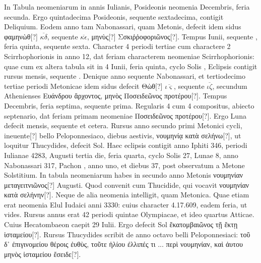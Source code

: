 
In Tabula neomeniarum in annis Iulianis, Posideonis neomenia 
Decembris, feria secunda.
Ergo quintadecima Posideonis, sequente
sextadecima, contigit Deliquium.
Eodem anno tam Nabonassari,
quam Metonis, defecit idem
 sidus \textgreek{φαμηνὼθ[?]} $\overline{\kappa\delta}$,
 sequente $\overline{\kappa\epsilon}$, \textgreek{μηνὺς[?]}
\textgreek{Σσκιῤῥοφοριῶνος[?]}.
Tempus  Iunii, sequente , feria quinta,
sequente sexta.
Character 4 periodi tertiae cum charactere
2 Scirrhophorionis in anno 12, dat feriam  characterem neomeniae
Scirrhophorionis: quae cum ex altera tabula sit in 4 Iunii, feria
quinta, cyclo Solis , Eclipsis contigit rursus  mensis, 
 sequente
.
Denique anno sequente Nabonassari, et tertiodecimo
tertiae periodi Metonicae idem sidus defecit
 \textgreek{Θὼθ[?]} $\overline{\iota\varsigma}$, sequente
$\overline{\iota\zeta}$, secundum Athenienses
 \textgreek{Ευάνδρου ἄρχοντος, μηνὸς Ποσειδεῶνος προτέρου[?]}.
Tempus  Decembris, feria septima, sequente prima.
Regularis
4 cum 4 compositus, abiecto septenario, dat feriam primam
neomeniae \textgreek{Ποσειδεῶνος προτέρου[?]}.
Ergo Luna defecit  mensis, sequente
 et cetera.
Rursus anno secundo primi Metonici cycli, ineuente[?]
bello Peloponnesiaco, diebus aestivis,
 \textgreek{νουμηνίᾳ κατὰ σελήνω[?]}, ut loquitur
Thucydides, defecit Sol.
Haec eclipsis contigit anno Iphiti 346, periodi
Iulianae 4283, Augusti tertia die, feria quarta, cyclo Solis 27, Lunae
8, anno Nabonassari 317, Pachon , anno uno, et diebus 37, post
observatum a Metone Solstitium.
In tabula neomeniarum habes
in secundo anno Metonis \textgreek{νουμηνίαν μεταγειτνιῶνος[?]}
  Augusti.
Quod
convenit cum Thucidide, qui vocavit \textgreek{νουμηνίαν κατὰ σελήνην[?]}.
Neque
de alia neomenia intelligit, quam Metonica.
Quae etiam erat neomenia
Elul Iudaici anni 3330: cuius character 4.17.609, eadem feria, ut
vides.
Rursus annus erat 42 periodi quintae Olympiacae, et ideo quartus
Atticae.
Cuius Hecatombaeon caepit 29 Iulii.
Ergo defecit Sol \textgreek{ἕκατομβαιῶνος
τῇ ἕκτῃ ἱσταμείου[?]}.
Rursus Thucydides scribit de anno octavo
belli Peloponnesiaci: \textgreek{τοῦ δ᾽ ἐπιγινομείου θέροις ἐυθὺς,
 τοῦτε ἡλίου ἐλλιπές τι
... περὶ νουμηνίαν, καὶ ἀυτου μηνὸς ἱσταμείου ἔσειδε[?]}.
